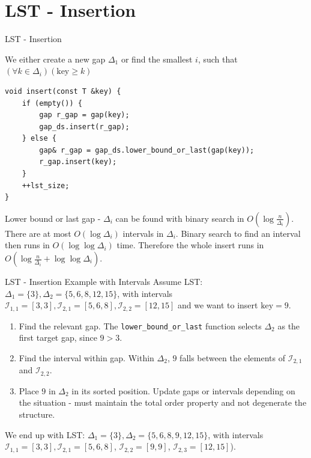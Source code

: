 \documentclass[aspectratio=169,xcolor=dvipsnames]{beamer}
\begin{document}

\section{LST - Insertion}
\begin{frame}[fragile]{LST - Insertion}

We either create a new gap $\Delta_1$ or find the smallest $i$, such that $\left(\forall k\in\Delta_i\right) \left(\text{key} \geq k\right)$

\begin{verbatim}
void insert(const T &key) {
    if (empty()) {
        gap r_gap = gap(key);
        gap_ds.insert(r_gap);
    } else {
        gap& r_gap = gap_ds.lower_bound_or_last(gap(key));
        r_gap.insert(key);
    }
    ++lst_size;
}
\end{verbatim}

Lower bound or last gap - $\Delta_i$ can be found with binary search in $O\left( \log\frac{n}{\Delta_i} \right) $. There are at most $O\left( \log \Delta_i \right)$ intervals in $\Delta_i$. Binary search to find an interval then runs in $O\left( \log \log \Delta_i \right)$ time. Therefore the whole insert runs in $O\left(\log\frac{n}{\Delta_i} + \log \log \Delta_i \right)$.
\end{frame}


\begin{frame}{LST - Insertion Example with Intervals}
Assume LST: $\Delta_1 = \{3\}, \Delta_2 = \{5, 6, 8, 12, 15\}$, with intervals
$\mathcal{I}_{1,1}=[3,3],\mathcal{I}_{2,1}=[5,6,8],\mathcal{I}_{2,2}=[12,15]$ and we want to insert $\text{key}=9$.

\begin{enumerate}
    \item Find the relevant gap. The \texttt{lower\_bound\_or\_last} function selects $\Delta_2$ as the first target gap, since $9 > 3$.
    \item Find the interval within gap. Within $\Delta_2$, $9$ falls between the elements of $\mathcal{I}_{2,1}$ and $\mathcal{I}_{2,2}$.
    \item Place $9$ in $\Delta_2$ in its sorted position. Update gaps or intervals depending on the situation - must maintain the total order property and not degenerate the structure.
\end{enumerate}

We end up with LST: $\Delta_1 = \{3\}, \Delta_2 = \{5, 6, 8, 9, 12, 15\}$, with intervals $\mathcal{I}_{1,1}=[3,3], \mathcal{I}_{2,1}=[5,6,8]$, $\mathcal{I}_{2,2}=[9,9]$, $\mathcal{I}_{2,3}=[12,15]$).

\end{frame}
\end{document}
